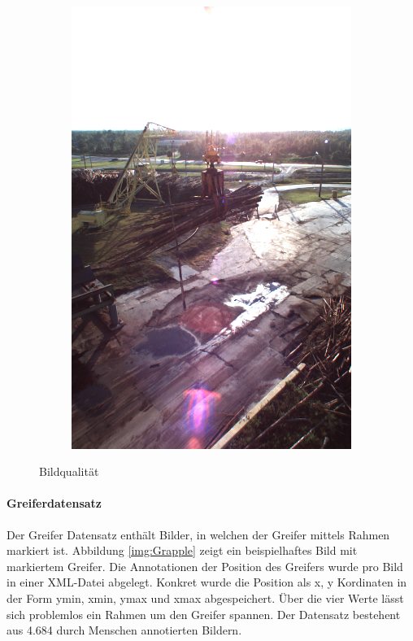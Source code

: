 \begin{figure}[h]
\begin{subfigure}[c]{0.24\textwidth}
			\includegraphics[width=1\textwidth]{bilder/Grundlagen/Daten_Bildqualitaet/Reflexionen.png}
		\end{subfigure}
		\caption{Bildqualität}
		\label{img:Bildqualität}
	\end{figure}
		
	\paragraph{Greiferdatensatz} Der Greifer Datensatz enthält Bilder, in welchen der Greifer mittels Rahmen markiert ist. Abbildung \ref{img:Grapple} zeigt ein beispielhaftes Bild mit markiertem Greifer. Die Annotationen der Position des Greifers wurde pro Bild in einer XML-Datei abgelegt. Konkret wurde die Position als x, y Kordinaten in der Form ymin, xmin, ymax und xmax  abgespeichert. Über die vier Werte lässt sich problemlos ein Rahmen um den Greifer spannen. Der Datensatz bestehent aus 4.684 durch Menschen annotierten Bildern.
	 
